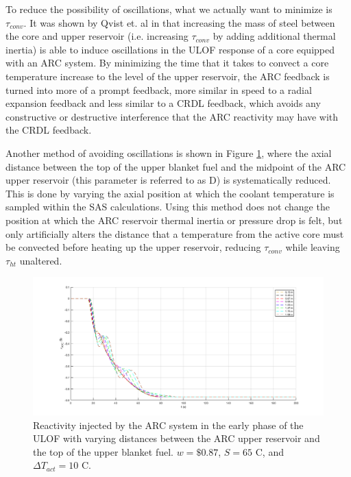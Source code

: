 \documentclass[11pt, oneside]{article}   	%
\begin{document}
To reduce the possibility of oscillations, what we actually want to minimize is $\tau_{conv}$. 
It was shown by Qvist et. al in \cite{ARC_Annals} that increasing the mass of steel between the core and upper reservoir (i.e. increasing $\tau_{conv}$ by adding additional thermal inertia) is able to induce oscillations in the ULOF response of a core equipped with an ARC system. 
By minimizing the time that it takes to convect a core temperature increase to the level of the upper reservoir, the ARC feedback is turned into more of a prompt feedback, more similar in speed to a radial expansion feedback and less similar to a CRDL feedback, which avoids any constructive or destructive interference that the ARC reactivity may have with the CRDL feedback.

Another method of avoiding oscillations is shown in Figure \ref{fig:rho_ARC_withD}, where the axial distance between the top of the upper blanket fuel and the midpoint of the ARC upper reservoir (this parameter is referred to as D) is systematically reduced.
This is done by varying the axial position at which the coolant temperature is sampled within the SAS calculations.
Using this method does not change the position at which the ARC reservoir thermal inertia or pressure drop is felt, but only artificially alters the distance that a temperature from the active core must be convected before heating up the upper reservoir, reducing $\tau_{conv}$ while leaving $\tau_{ht}$ unaltered.

\begin{figure}[h!]
\includegraphics[width=18cm]{rho_ARC_withD}
\centering
\caption{Reactivity injected by the ARC system in the early phase of the ULOF with varying distances between the ARC upper reservoir and the top of the upper blanket fuel. $w=\$0.87$, $S=65$ C, and $\Delta T_{act}=10$ C.}
\label{fig:rho_ARC_withD}
\end{figure}
\end{document}
